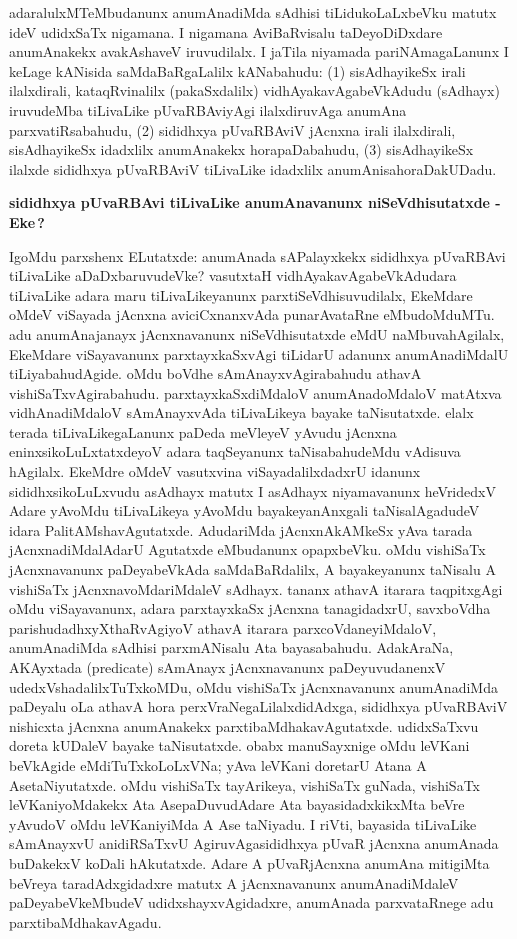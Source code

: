 adaralulxMTeMbudanunx anumAnadiMda sAdhisi tiLidukoLaLxbeVku matutx ideV udidxSaTx nigamana. I nigamana AviBaRvisalu taDeyoDiDxdare anumAnakekx avakAshaveV iruvudilalx. I jaTila niyamada pariNAmagaLanunx I keLage kANisida saMdaBaRgaLalilx kANabahudu: (1) sisAdhayikeSx irali ilalxdirali, kataqRvinalilx (pakaSxdalilx) vidhAyakavAgabeVkAdudu (sAdhayx) iruvudeMba tiLivaLike pUvaRBAviyAgi ilalxdiruvAga anumAna parxvatiRsabahudu, (2) sididhxya pUvaRBAviV jAcnxna irali ilalxdirali, sisAdhayikeSx idadxlilx anumAnakekx horapaDabahudu, (3) sisAdhayikeSx ilalxde sididhxya pUvaRBAviV tiLivaLike idadxlilx anumAnisahoraDakUDadu.

\bigskip
\begin{center}
{\Large\bf sididhxya pUvaRBAvi tiLivaLike anumAnavanunx niSeVdhisutatxde - Eke\,?}
\end{center}

IgoMdu parxshenx ELutatxde: anumAnada sAPalayxkekx sididhxya pUvaRBAvi tiLi\-vaLike aDaDxbaruvudeVke? vasutxtaH vidhAyakavAgabeVkAdudara tiLivaLike adara maru tiLi\-vaLikeyanunx parxtiSeVdhisuvudilalx, EkeMdare oMdeV viSayada jAcnxna aviciCxnanxvAda puna\-rA\-vataRne eMbudoMduMTu. adu anumAnajanayx jAcnxnavanunx niSeVdhisutatxde eMdU naMbuvahAgilalx, EkeMdare viSayavanunx parxtayxkaSxvAgi tiLidarU adanunx anumAna\break\-diMdalU tiLiyabahudAgide. oMdu boVdhe sAmAnayxvAgirabahudu athavA vishiSaTx\-vAgirabahudu. parxtayxkaSxdiMdaloV anumAnadoMdaloV matAtxva vidhAnadiMdaloV sAmAnayxvAda tiLivaLikeya bayake taNisutatxde. elalx terada tiLivaLikegaLanunx paDeda meVleyeV yAvudu jAcnxna eninxsikoLuLxtatxdeyoV adara taqSeyanunx taNisabahudeMdu vAdisuva hAgilalx. EkeMdre oMdeV vasutxvina viSayadalilxdadxrU idanunx sididhxsi\-koLuLx\-vudu asAdhayx matutx I asAdhayx niyamavanunx heVridedxV Adare yAvoMdu tiLi\-vaLikeya yAvoMdu bayakeyanAnxgali taNisalAgadudeV idara PalitAMshavAgutatxde. Aduda\-riMda jAcnxnAkAMkeSx yAva tarada jAcnxnadiMdalAdarU Agutatxde eMbudanunx opapxbeVku. oMdu vishiSaTx jAcnxnavanunx paDeyabeVkAda saMdaBaRdalilx, A bayakeyanunx taNisalu A vishiSaTx jAcnxnavoMdariMdaleV sAdhayx. tananx athavA itarara taqpitxgAgi oMdu viSaya\-vanunx, adara parxtayxkaSx jAcnxna tanagidadxrU, savxboVdha parishudadhxyXthaRvAgiyoV athavA itarara parxcoVdaneyiMdaloV, anumAnadiMda sAdhisi parxmANisalu Ata bayasabahudu. AdakAraNa, AKAyxtada {\rm(predicate)} sAmAnayx jAcnxnavanunx paDeyuvudanenxV udedxVsha\-dalilxTuTxkoMDu, oMdu vishiSaTx jAcnxnavanunx anumAnadiMda paDeyalu oLa athavA hora perxVraNegaLilalxdidAdxga, sididhxya pUvaRBAviV nishicxta jAcnxna anumAnakekx parxtibaMdhaka\-vAgutatxde. udidxSaTxvu doreta kUDaleV bayake taNisutatxde. obabx manuSayxnige oMdu leVKani beVkAgide eMdiTuTxkoLoLxVNa; yAva leVKani doretarU Atana A Ase\break taNiyu\-tatxde. oMdu vishiSaTx tayArikeya, vishiSaTx guNada, vishiSaTx leVKaniyoMdakekx Ata AsepaDuvudAdare Ata bayasidadxkikxMta beVre yAvudoV oMdu leVKani\-yiMda A Ase taNiyadu. I riVti, bayasida tiLivaLike sAmAnayxvU anidiRSaTxvU AgiruvAga\break sididhxya pUvaR jAcnxna anumAnada buDakekxV koDali hAkutatxde. Adare A pUvaR\-jAcnxna anumAna mitigiMta beVreya taradAdxgidadxre matutx A jAcnxnavanunx anumAnadiMdaleV paDeyabeVkeMbudeV udidxshayxvAgidadxre, anumAnada parxvataRnege adu parxtibaMdhaka\break\-vAgadu.

